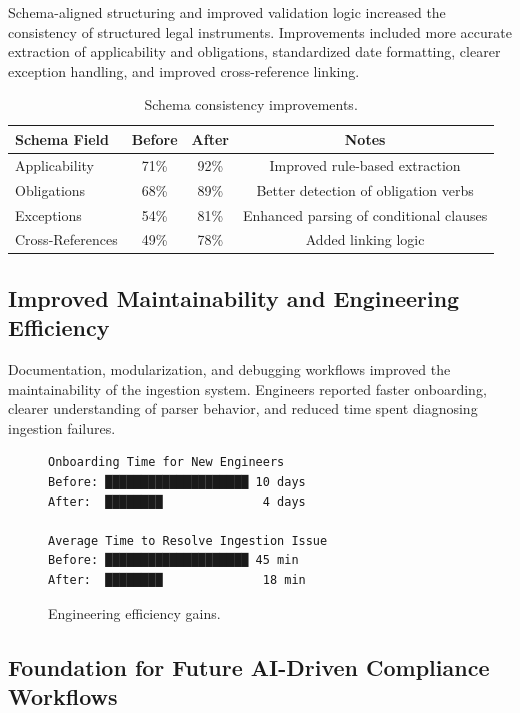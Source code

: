\documentclass[sigconf]{acmart}
\begin{document}
Schema-aligned structuring and improved validation logic increased the consistency of structured legal instruments. Improvements included more accurate extraction of applicability and obligations, standardized date formatting, clearer exception handling, and improved cross-reference linking.

\begin{table}[h]
\centering
\begin{tabular}{lccc}
\toprule
\textbf{Schema Field} & \textbf{Before} & \textbf{After} & \textbf{Notes} \\
\midrule
Applicability & 71\% & 92\% & Improved rule-based extraction \\
Obligations & 68\% & 89\% & Better detection of obligation verbs \\
Exceptions & 54\% & 81\% & Enhanced parsing of conditional clauses \\
Cross-References & 49\% & 78\% & Added linking logic \\
\bottomrule
\end{tabular}
\caption{Schema consistency improvements.}
\end{table}

\subsection{Improved Maintainability and Engineering Efficiency}

Documentation, modularization, and debugging workflows improved the maintainability of the ingestion system. Engineers reported faster onboarding, clearer understanding of parser behavior, and reduced time spent diagnosing ingestion failures.

\begin{figure}[h]
\centering
\begin{verbatim}
Onboarding Time for New Engineers
Before: ████████████████████ 10 days
After:  ████████              4 days

Average Time to Resolve Ingestion Issue
Before: ████████████████████ 45 min
After:  ████████              18 min
\end{verbatim}
\caption{Engineering efficiency gains.}
\end{figure}

\subsection{Foundation for Future AI-Driven Compliance Workflows}
\end{document}
